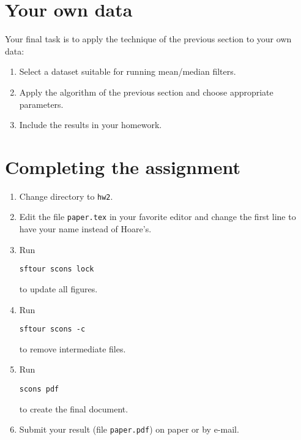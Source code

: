 \lstset{language=python,numbers=left,numberstyle=\tiny,showstringspaces=false}


\section{Your own data}

Your final task is to apply the technique of the previous section to
your own data:
\begin{enumerate}
\item Select a dataset suitable for running mean/median filters.
\item Apply the algorithm of the previous section and choose
  appropriate parameters.
\item Include the results in your homework.
\end{enumerate}

\newpage

\section{Completing the assignment}

\begin{enumerate}
\item Change directory to \texttt{hw2}.
\item Edit the file \texttt{paper.tex} in your favorite editor and change the
  first line to have your name instead of Hoare's.
\item Run
\begin{verbatim}
sftour scons lock
\end{verbatim}
to update all figures.
\item Run
\begin{verbatim}
sftour scons -c
\end{verbatim}
to remove intermediate files.
\item Run
\begin{verbatim}
scons pdf
\end{verbatim}
to create the final document.
\item Submit your result (file \texttt{paper.pdf}) on paper or by
e-mail.
\end{enumerate}
